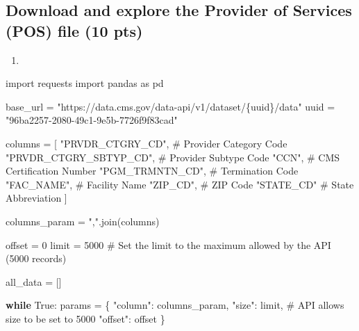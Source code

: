 \documentclass[
  letterpaper,
  DIV=11,
  numbers=noendperiod]{scrartcl}
\newenvironment{Shaded}{\begin{snugshade}}{\end{snugshade}}
\newcommand{\CommentTok}[1]{\textcolor[rgb]{0.37,0.37,0.37}{#1}}
\newcommand{\ControlFlowTok}[1]{\textcolor[rgb]{0.00,0.23,0.31}{\textbf{#1}}}
\newcommand{\DecValTok}[1]{\textcolor[rgb]{0.68,0.00,0.00}{#1}}
\newcommand{\ImportTok}[1]{\textcolor[rgb]{0.00,0.46,0.62}{#1}}
\newcommand{\NormalTok}[1]{\textcolor[rgb]{0.00,0.23,0.31}{#1}}
\newcommand{\OperatorTok}[1]{\textcolor[rgb]{0.37,0.37,0.37}{#1}}
\newcommand{\SpecialCharTok}[1]{\textcolor[rgb]{0.37,0.37,0.37}{#1}}
\newcommand{\StringTok}[1]{\textcolor[rgb]{0.13,0.47,0.30}{#1}}
\newcommand{\VariableTok}[1]{\textcolor[rgb]{0.07,0.07,0.07}{#1}}
\providecommand{\tightlist}{%
  \setlength{\itemsep}{0pt}\setlength{\parskip}{0pt}}\usepackage{longtable,booktabs,array}
\begin{document}
\subsection{Download and explore the Provider of Services (POS) file (10
pts)}\label{download-and-explore-the-provider-of-services-pos-file-10-pts}

\begin{enumerate}
\def\labelenumi{\arabic{enumi}.}
\tightlist
\item
\end{enumerate}

\begin{Shaded}
\begin{Highlighting}[]
\ImportTok{import}\NormalTok{ requests}
\ImportTok{import}\NormalTok{ pandas }\ImportTok{as}\NormalTok{ pd}

\NormalTok{base\_url }\OperatorTok{=} \StringTok{"https://data.cms.gov/data{-}api/v1/dataset/}\SpecialCharTok{\{uuid\}}\StringTok{/data"}
\NormalTok{uuid }\OperatorTok{=} \StringTok{"96ba2257{-}2080{-}49c1{-}9e5b{-}7726f9f83cad"}

\NormalTok{columns }\OperatorTok{=}\NormalTok{ [}
    \StringTok{"PRVDR\_CTGRY\_CD"}\NormalTok{,        }\CommentTok{\# Provider Category Code}
    \StringTok{"PRVDR\_CTGRY\_SBTYP\_CD"}\NormalTok{,  }\CommentTok{\# Provider Subtype Code}
    \StringTok{"CCN"}\NormalTok{,                   }\CommentTok{\# CMS Certification Number}
    \StringTok{"PGM\_TRMNTN\_CD"}\NormalTok{,         }\CommentTok{\# Termination Code}
    \StringTok{"FAC\_NAME"}\NormalTok{,              }\CommentTok{\# Facility Name}
    \StringTok{"ZIP\_CD"}\NormalTok{,                }\CommentTok{\# ZIP Code}
    \StringTok{"STATE\_CD"}               \CommentTok{\# State Abbreviation}
\NormalTok{]}

\NormalTok{columns\_param }\OperatorTok{=} \StringTok{","}\NormalTok{.join(columns)}

\NormalTok{offset }\OperatorTok{=} \DecValTok{0}
\NormalTok{limit }\OperatorTok{=} \DecValTok{5000}  \CommentTok{\# Set the limit to the maximum allowed by the API (5000 records)}

\NormalTok{all\_data }\OperatorTok{=}\NormalTok{ []}

\ControlFlowTok{while} \VariableTok{True}\NormalTok{:}
\NormalTok{    params }\OperatorTok{=}\NormalTok{ \{}
        \StringTok{"column"}\NormalTok{: columns\_param,}
        \StringTok{"size"}\NormalTok{: limit,  }\CommentTok{\# API allows size to be set to 5000}
        \StringTok{"offset"}\NormalTok{: offset}
\NormalTok{    \}}


\end{Highlighting}
\end{Shaded}
\end{document}
